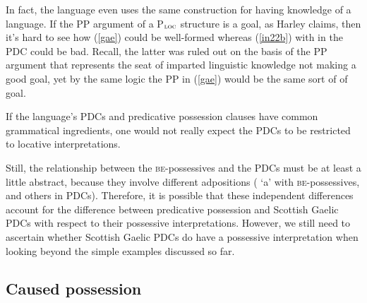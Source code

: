 \documentclass[output=paper,colorlinks,citecolor=brown]{langscibook}
\begin{document}

\noindent In fact, the language even uses the same construction for having knowledge of a language. If the PP argument of a P$_{\textsc{loc}}$ structure is a goal, as Harley claims, then it's hard to see how (\ref{gae}) could be well-formed whereas (\ref{in22b}) with  in the PDC could be bad. Recall, the latter was ruled out on the basis of the PP argument that represents the seat of imparted linguistic knowledge not making a good goal, yet by the same logic the PP in (\ref{gae}) would be the same sort of of goal.


\noindent If the language's PDCs and predicative possession clauses have common grammatical ingredients, one would not really expect the PDCs to be restricted to locative interpretations. 

Still, the relationship between the \textsc{be}-possessives and the PDCs must be at least a little abstract, because they involve different adpositions ( `a' with \textsc{be}-possessives,   and others in PDCs). Therefore, it is possible that these independent differences account for the difference between predicative possession and Scottish Gaelic PDCs with respect to their possessive interpretations. However, we still need to ascertain whether Scottish Gaelic PDCs do have a possessive interpretation when looking beyond the simple examples discussed so far. 

\subsection{Caused possession}
\end{document}
